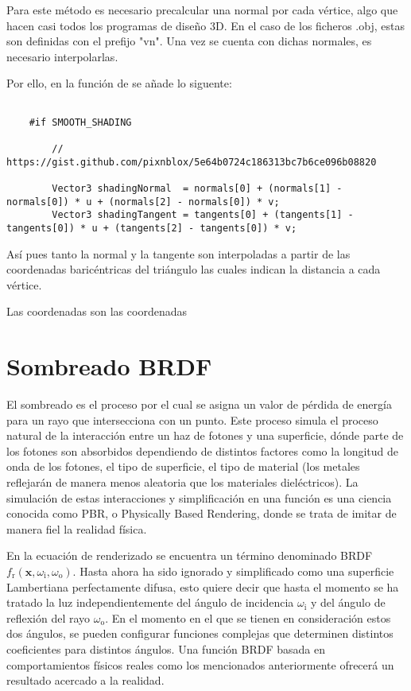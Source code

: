 	Para este método es necesario precalcular una normal por cada vértice, algo que hacen casi todos los programas de diseño 3D. En el caso de los ficheros .obj, estas son definidas con el prefijo "vn". Una vez se cuenta con dichas normales, es necesario interpolarlas. 

	Por ello, en la función  de  se añade lo siguente:
	
	\begin{lstlisting}
			
	#if SMOOTH_SHADING 

        // https://gist.github.com/pixnblox/5e64b0724c186313bc7b6ce096b08820

        Vector3 shadingNormal  = normals[0] + (normals[1] - normals[0]) * u + (normals[2] - normals[0]) * v;
        Vector3 shadingTangent = tangents[0] + (tangents[1] - tangents[0]) * u + (tangents[2] - tangents[0]) * v;

	\end{lstlisting}
			
	Así pues tanto la normal y la tangente son interpoladas a partir de las coordenadas baricéntricas del triángulo  las cuales indican la distancia a cada vértice.
	
	
	
		
	Las coordenadas  son las coordenadas 
	
	
	\section{Sombreado BRDF}
	
	El sombreado es el proceso por el cual se asigna un valor de pérdida de energía para un rayo que intersecciona con un punto. Este proceso simula el proceso natural de la interacción entre un haz de fotones y una superficie, dónde parte de los fotones son absorbidos dependiendo de distintos factores como la longitud de onda de los fotones, el tipo de superficie, el tipo de material (los metales reflejarán de manera menos aleatoria que los materiales dieléctricos). La simulación de estas interacciones y simplificación en una función es una ciencia conocida como PBR, o Physically Based Rendering, donde se trata de imitar de manera fiel la realidad física. 
		
	En la ecuación de renderizado se encuentra un término denominado BRDF $f_{\text{r}}(\mathbf {x} ,\omega _{\text{i}},\omega _{\text{o}})$. Hasta ahora ha sido ignorado y simplificado como una superficie Lambertiana perfectamente difusa, esto quiere decir que hasta el momento se ha tratado la luz independientemente del ángulo de incidencia $\omega _{\text{i}}$ y del ángulo de reflexión del rayo $\omega _{\text{o}}$. En el momento en el que se tienen en consideración estos dos ángulos, se pueden configurar funciones complejas que determinen distintos coeficientes para distintos ángulos. Una función BRDF basada en comportamientos físicos reales como los mencionados anteriormente ofrecerá un resultado acercado a la realidad. 
	
